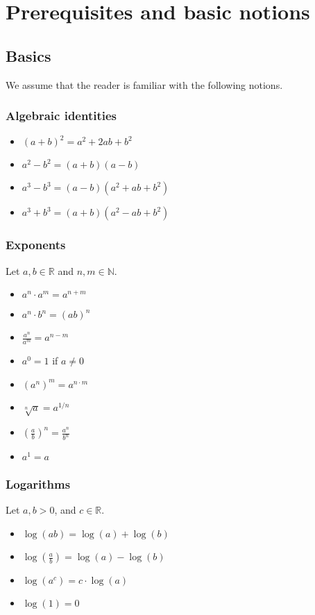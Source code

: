 \chapter{Prerequisites and basic notions}

\section{Basics}

We assume that the reader is familiar with the following notions.

\subsection{Algebraic identities}
\begin{itemize}[itemsep=1pt,label=$\circ$]
    \item $(a + b)^2 = a^2 + 2ab + b^2$
    \item $a^2 - b^2 = (a + b)(a - b)$
    \item $a^3 - b^3 = (a - b)(a^2 + ab + b^2)$
    \item $a^3 + b^3 = (a + b)(a^2 - ab + b^2)$
\end{itemize}

\subsection{Exponents}
Let $a, b \in \mathbb{R}$ and $n, m \in \mathbb{N}$.
\begin{itemize}[itemsep=1pt,label=$\circ$]
    \item $a^n \cdot a^m = a^{n+m}$
    \item $a^n \cdot b^n = (ab)^n$
    \item $\frac{a^n}{a^m} = a^{n-m}$
    \item $a^0 = 1$ if $a \neq 0$
    \item $(a^n)^m = a^{n \cdot m}$
    \item $\sqrt[n]{a} = a^{1/n}$
    \item $(\frac{a}{b})^n = \frac{a^n}{b^n}$
    \item $a^1 = a$
\end{itemize}

\subsection{Logarithms}
Let $a, b > 0$, and $c \in \mathbb{R}$.
\begin{itemize}[itemsep=1pt,label=$\circ$]
    \item $\log(ab) = \log(a) + \log(b)$
    \item $\log(\frac{a}{b}) = \log(a) - \log(b)$
    \item $\log(a^c) = c \cdot \log(a)$
    \item $\log(1) = 0$
\end{itemize}


